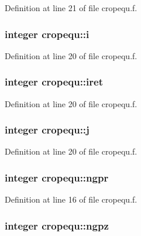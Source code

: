 Definition at line 21 of file cropequ.f.\hypertarget{namespacecropequ_29c60057cd3ac46029ead264faa6e632}{
\subsubsection[i]{\setlength{\rightskip}{0pt plus 5cm}integer {\bf cropequ::i}}}
\label{namespacecropequ_29c60057cd3ac46029ead264faa6e632}




Definition at line 20 of file cropequ.f.\hypertarget{namespacecropequ_f6dbf4b8794c7af19a050269451861e5}{
\subsubsection[iret]{\setlength{\rightskip}{0pt plus 5cm}integer {\bf cropequ::iret}}}
\label{namespacecropequ_f6dbf4b8794c7af19a050269451861e5}




Definition at line 20 of file cropequ.f.\hypertarget{namespacecropequ_91eff21312f6ddff6f7faf416d09a8a5}{
\subsubsection[j]{\setlength{\rightskip}{0pt plus 5cm}integer {\bf cropequ::j}}}
\label{namespacecropequ_91eff21312f6ddff6f7faf416d09a8a5}




Definition at line 20 of file cropequ.f.\hypertarget{namespacecropequ_b915d54338bbf1eef691e09d62c5ca74}{
\subsubsection[ngpr]{\setlength{\rightskip}{0pt plus 5cm}integer {\bf cropequ::ngpr}}}
\label{namespacecropequ_b915d54338bbf1eef691e09d62c5ca74}




Definition at line 16 of file cropequ.f.\hypertarget{namespacecropequ_5e809f294cb46948b68e7f84c5b3e5e7}{
\subsubsection[ngpz]{\setlength{\rightskip}{0pt plus 5cm}integer {\bf cropequ::ngpz}}}
\label{namespacecropequ_5e809f294cb46948b68e7f84c5b3e5e7}




